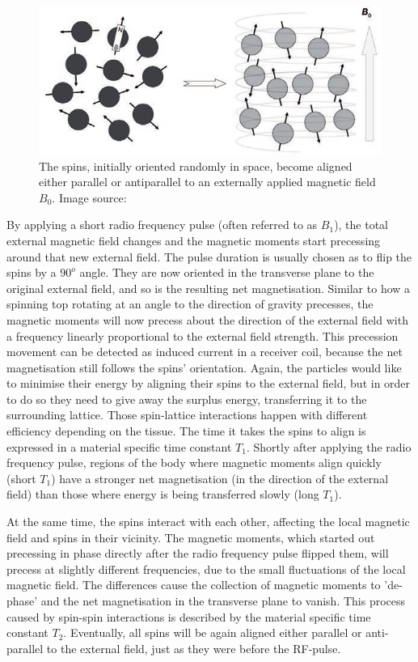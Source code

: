 \begin{figure}[h!]
\centering
\includegraphics[width=0.8\linewidth]{../fig/intro/spin_align}
\caption[The spins, initially oriented randomly, become aligned either parallel or antiparallel to an extern magnetic field $B_0$. Image source: \cite{Maidment2014}]{The spins, initially oriented randomly in space, become aligned either parallel or antiparallel to an externally applied magnetic field $B_0$. Image source: \cite{Maidment2014}}
\label{fig:spin_align}
\end{figure}

By applying a short radio frequency pulse (often referred to as $B_1$), the total external magnetic field changes and the magnetic moments start precessing around that new external field.
The pulse duration is usually chosen as to flip the spins by a $90^o$ angle.
They are now oriented in the transverse plane to the original external field, and so is the resulting net magnetisation.
Similar to how a spinning top rotating at an angle to the direction of gravity precesses, the magnetic moments will now precess about the direction of the external field with a frequency linearly proportional to the external field strength.
This precession movement can be detected as induced current in a receiver coil, because the net magnetisation still follows the spins' orientation. 
Again, the particles would like to minimise their energy by aligning their spins to the external field, but in order to do so they need to give away the surplus energy, transferring it to the surrounding lattice.
Those spin-lattice interactions happen with different efficiency depending on the tissue.
The time it takes the spins to align is expressed in a material specific time constant $T_1$.
Shortly after applying the radio frequency pulse, regions of the body where magnetic moments align quickly (short $T_1$) have a stronger net magnetisation (in the direction of the external field) than those where energy is being transferred slowly (long $T_1$).

At the same time, the spins interact with each other, affecting the local magnetic field and spins in their vicinity.
The magnetic moments, which started out precessing in phase directly after the radio frequency pulse flipped them, will precess at slightly different frequencies, due to the small fluctuations of the local magnetic field.
The differences cause the collection of magnetic moments to 'de-phase' and the net magnetisation in the transverse plane to vanish.
This process caused by spin-spin interactions is described by the material specific time constant $T_2$.
Eventually, all spins will be again aligned either parallel or anti-parallel to the external field, just as they were before the RF-pulse.

